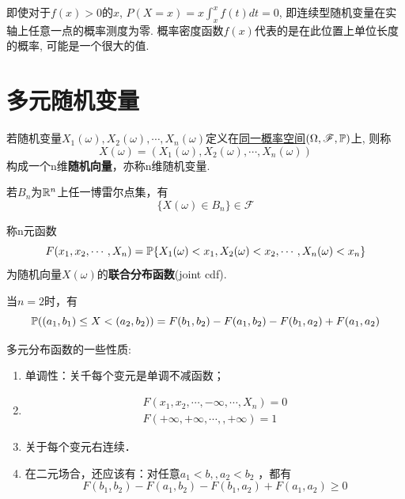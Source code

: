 \begin{remark}
    即使对于$f(x)>0$的$x$, $P(X=x)=x\int_{x}^x f(t)dt=0$, 即连续型随机变量在实轴上任意一点的概率测度为零. 概率密度函数$f(x)$代表的是在此位置上单位长度的概率, 可能是一个很大的值.
\end{remark}

\section{多元随机变量}

\begin{definition}[随机向量]
    若随机变量$X_1(\omega), X_2(\omega),\cdots , X_n(\omega)$定义在\underline{同一概率空间}$(\Omega,\mathscr{F},\P)$上, 则称
    \[ X(\omega) = (X_1(\omega), X_2(\omega),\cdots , X_n(\omega)) \]
    构成一个n维\textbf{随机向量}，亦称n维随机变量.
\end{definition}

\begin{proposition}
    若$B_n$为$\R^n$上任一博雷尔点集，有
    \[ \{ X(\omega) \in B_n \} \in \mathscr{F} \]
\end{proposition}

\begin{definition}
    称n元函数
    \[ F(x_1,x_2, \cdots , X_n)=\P \{ X_1(\omega)<x_1, X_2(\omega)<x_2,\cdots , X_n(\omega)<x_n \} \]
    为随机向量$X(\omega)$的\textbf{联合分布函数}(joint cdf).
\end{definition}

当$n=2$时，有
\begin{equation}\label{equ:2dim_Prob}
    \P((a_1,b_1)\le X < (a_2,b_2))=F(b_1,b_2)-F(a_1,b_2)-F(b_1,a_2)+F(a_1,a_2)
\end{equation}

\begin{property}
    多元分布函数的一些性质:
    \begin{enumerate}
        \item 单调性：关千每个变元是单调不减函数；
        \item \begin{align*}
                  F(x_1,x_2, \cdots, -\infty, \cdots, X_n)=0 \\
                  F(+\infty,+\infty, \cdots, , +\infty)=1
              \end{align*}
        \item 关于每个变元右连续．
        \item 在二元场合，还应该有：对任意$ a_1 <b,,a_2<b_2$ ，都有
              \[ F(b_1,b_2)-F(a_1,b_2)-F(b_1,a_2)+F(a_1,a_2)\ge 0   \]
    \end{enumerate}
\end{property}

